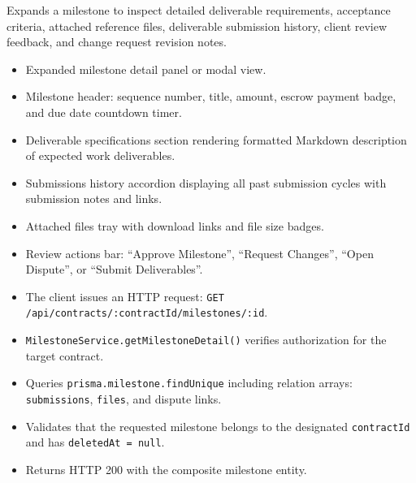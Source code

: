 \noindent Expands a milestone to inspect detailed deliverable requirements, acceptance criteria, attached reference files, deliverable submission history, client review feedback, and change request revision notes.

\begin{itemize}[leftmargin=1.6em,topsep=3pt,itemsep=2pt,parsep=0pt,label=$\bullet$]
      \item Expanded milestone detail panel or modal view.
      \item Milestone header: sequence number, title, amount, escrow payment badge, and due date countdown timer.
      \item Deliverable specifications section rendering formatted Markdown description of expected work deliverables.
      \item Submissions history accordion displaying all past submission cycles with submission notes and links.
      \item Attached files tray with download links and file size badges.
      \item Review actions bar: ``Approve Milestone'', ``Request Changes'', ``Open Dispute'', or ``Submit Deliverables''.
\end{itemize}

\begin{itemize}[leftmargin=1.6em,topsep=3pt,itemsep=2pt,parsep=0pt,label=$\bullet$]
      \item The client issues an HTTP request: \texttt{GET /\allowbreak{}api/\allowbreak{}contracts/\allowbreak{}:\allowbreak{}contractId/\allowbreak{}milestones/\allowbreak{}:\allowbreak{}id}.
      \item \texttt{MilestoneService.getMilestoneDetail()} verifies authorization for the target contract.
      \item Queries \texttt{prisma.milestone.findUnique} including relation arrays: \texttt{submissions}, \texttt{files}, and dispute links.
      \item Validates that the requested milestone belongs to the designated \texttt{contractId} and has \texttt{deletedAt = null}.
      \item Returns HTTP 200 with the composite milestone entity.
\end{itemize}

